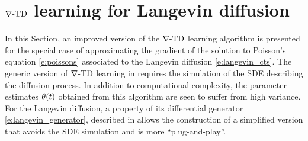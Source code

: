 \section{$\nabla\text{-TD}$ learning for Langevin diffusion}
\label{s:diff_td_langevin}
In this Section, an improved version of the $\nabla\text{-TD}$ learning algorithm is presented for the special case of approximating the gradient of the solution to Poisson's equation \eqref{e:poissons} associated to the Langevin diffusion \eqref{e:langevin_cts}. The generic version of $\nabla\text{-TD}$ learning in  requires the simulation of the SDE describing the diffusion process.  In addition to computational complexity, the parameter estimates $\theta(t)$ obtained from this algorithm are seen to suffer from high variance. For the Langevin diffusion, a property of its differential generator \eqref{e:langevin_generator},  described in  allows the construction of a simplified version that avoids the SDE simulation and is more ``plug-and-play''. 

